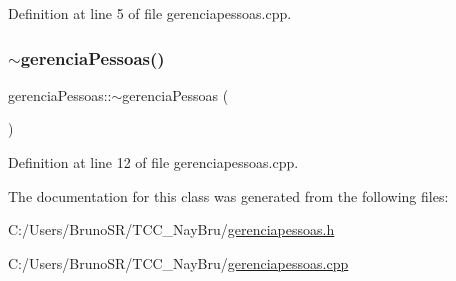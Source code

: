 Definition at line 5 of file gerenciapessoas.\+cpp.

\hypertarget{classgerencia_pessoas_a85f9272a309472903bf5b2ad0950973c}{}\label{classgerencia_pessoas_a85f9272a309472903bf5b2ad0950973c} 
\subsubsection{\texorpdfstring{$\sim$gerencia\+Pessoas()}{~gerenciaPessoas()}}
{\footnotesize\ttfamily gerencia\+Pessoas\+::$\sim$gerencia\+Pessoas (\begin{DoxyParamCaption}{ }\end{DoxyParamCaption})}



Definition at line 12 of file gerenciapessoas.\+cpp.



The documentation for this class was generated from the following files\+:\begin{DoxyCompactItemize}
\item 
C\+:/\+Users/\+Bruno\+S\+R/\+T\+C\+C\+\_\+\+Nay\+Bru/\hyperlink{gerenciapessoas_8h}{gerenciapessoas.\+h}\item 
C\+:/\+Users/\+Bruno\+S\+R/\+T\+C\+C\+\_\+\+Nay\+Bru/\hyperlink{gerenciapessoas_8cpp}{gerenciapessoas.\+cpp}\end{DoxyCompactItemize}
